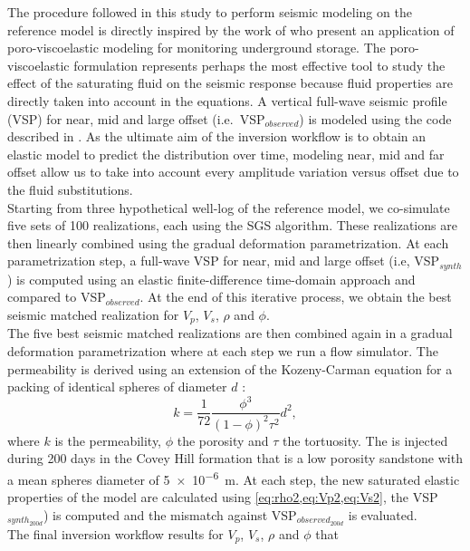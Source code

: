 The procedure followed in this study to perform seismic modeling on the
reference model is directly inspired by the work of \citet{Carcione2006} who
present an application of poro-viscoelastic modeling for monitoring underground
 storage. The poro-viscoelastic formulation represents perhaps the most
effective tool to study the effect of the saturating fluid on the seismic
response because fluid properties are directly taken into account in the
equations. A vertical full-wave seismic profile (VSP) for near, mid and large
offset (i.e.\ VSP$_{observed}$) is modeled using the code described in
\citet{Giroux2012}. As the ultimate aim of the inversion workflow is to obtain
an elastic model to predict the  distribution over time, modeling near,
mid and far offset allow us to take into account every amplitude variation
versus offset due to the fluid substitutions.\\
Starting from three hypothetical well-log of the reference model, we co-simulate
five sets of 100 realizations, each using the SGS algorithm. These realizations
are then linearly combined using the gradual deformation parametrization. At
each parametrization step, a full-wave VSP for near, mid and large offset (i.e,
VSP$_{synth}$) is computed using an elastic finite-difference time-domain
approach \citep{Bohlen2002} and compared to VSP$_{observed}$. At the end of this
iterative process, we obtain the best seismic matched realization for $V_p$,
$V_s$, $\rho$ and $\phi$.\\
The five best seismic matched realizations are then combined again in a gradual
deformation parametrization where at each step we run a  flow simulator.
The permeability is derived using an extension of the Kozeny-Carman equation
\citep{Kozeny1927,Carman1938} for a packing of identical spheres of diameter $d$
\citep{Mavko2009}:
\begin{equation}
k = \dfrac{1}{72}\dfrac{\phi^3}{(1-\phi)^2\tau^2}d^2,
\end{equation}
where $k$ is the permeability, $\phi$ the porosity and $\tau$ the tortuosity.
The  is injected during \num{200} days in the Covey Hill formation that
is a low porosity sandstone with a mean spheres diameter of \SI{5e-6}{\metre}.
At each step, the new  saturated elastic properties of the model are
calculated using \cref{eq:rho2,eq:Vp2,eq:Vs2}, the VSP$_{synth_{200d}}$) is
computed and the mismatch against VSP$_{observed_{200d}}$ is evaluated.\\
The final inversion workflow results for $V_p$, $V_s$, $\rho$ and $\phi$ that
